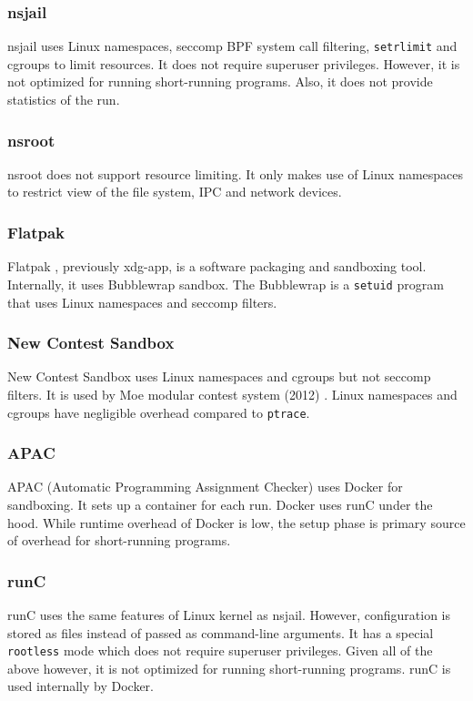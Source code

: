 \documentclass[en]{pracamgr}
\begin{document}
\subsubsection{nsjail} \label{subsubsection:nsjail}
nsjail \cite{google/nsjail} uses Linux namespaces, seccomp BPF system call filtering, \texttt{setrlimit} \cite{man_getrlimit_setrlimit_prlimit} and cgroups to limit resources. It does not require superuser privileges. However, it is not optimized for running short-running programs. Also, it does not provide statistics of the run.

\subsubsection{nsroot}
nsroot \cite{raknes2016nsroot} does not support resource limiting. It only makes use of Linux namespaces to restrict view of the file system, IPC and network devices.

\subsubsection{Flatpak}
Flatpak \cite{flatpak}, previously xdg-app, is a software packaging and sandboxing tool. Internally, it uses Bubblewrap sandbox. The Bubblewrap \cite{bubblewrap} is a \texttt{setuid} \cite{man_setuid} program that uses Linux namespaces and seccomp filters.

\subsubsection{New Contest Sandbox}
New Contest Sandbox \cite{marevs2012new} uses Linux namespaces and cgroups but not seccomp filters. It is used by Moe modular contest system (2012) \cite{marevs2012new}. Linux namespaces and cgroups have negligible overhead compared to \texttt{ptrace}.

\subsubsection{APAC}
APAC (Automatic Programming Assignment Checker) \cite{SPACEK20151665} uses Docker for sandboxing. It sets up a container for each run. Docker uses runC under the hood. While runtime overhead of Docker is low, the setup phase is primary source of overhead for short-running programs.

\subsubsection{runC}
runC \cite{cochak2021runc} uses the same features of Linux kernel as nsjail. However, configuration is stored as files instead of passed as command-line arguments. It has a special \texttt{rootless} mode which does not require superuser privileges. Given all of the above however, it is not optimized for running short-running programs. runC is used internally by Docker.
\end{document}
